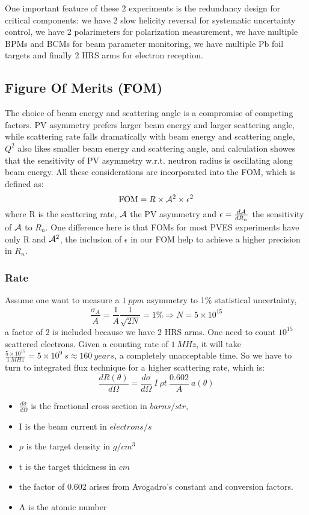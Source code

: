 One important feature of these 2 experiments is the redundancy design for critical
components: we have 2 slow helicity reversal for systematic uncertainty control,
we have 2 polarimeters for polarization measurement, we have multiple BPMs and
BCMs for beam parameter monitoring, we have multiple Pb foil targets and finally
2 HRS arms for electron reception.

\subsection{Figure Of Merits (FOM)}
The choice of beam energy and scattering angle is a compromise of competing
factors. PV asymmetry prefers larger beam energy and larger scattering angle,
while scattering rate falls dramatically with beam energy and scattering angle,
$Q^2$ also likes smaller beam energy and scattering angle, and calculation 
showes that the sensitivity of PV asymmetry w.r.t. neutron radius is oscillating
along beam energy. All these considerations are incorporated into the FOM, which
is defined as:
\begin{equation*}
    \text{FOM} = R \times \mathcal{A}^2 \times \epsilon^2
\end{equation*}
where R is the scattering rate, $\mathcal{A}$ the PV asymmetry and $\epsilon = \frac{d\mathcal{A}}{dR_n}$ 
the sensitivity of $\mathcal{A}$ to $R_n$. One difference here is that FOMs for most PVES 
experiments have only R and $\mathcal{A}^2$, the inclusion of $\epsilon$ in our FOM help
to achieve a higher precision in $R_n$.

\subsubsection{Rate}
Assume one want to measure a $1 \ ppm$ asymmetry to 1\% statistical uncertainty,
$$ \frac{\sigma_A}{A} = \frac{1}{A}\frac{1}{\sqrt{2N}} = 1\% \Rightarrow N = 5 \times 10^{15} $$
a factor of 2 is included because we have 2 HRS arms.
One need to count $10^{15}$ scattered electrons. Given a counting rate of $1\ MHz$, 
it will take $\frac{5\times 10^{15}}{1\ MHz} = 5\times 10^{9}\ s \approx 160 \ years$,
a completely unacceptable time. So we have to turn to integrated flux technique
for a higher scattering rate, which is:
\begin{equation}
    \frac{dR(\theta)}{d\Omega} = \frac{d\sigma}{d\Omega}\ I\ \rho t \  \frac{0.602}{A} \ a(\theta) 
\end{equation}
\begin{itemize}
    \item $\frac{d\sigma}{d\Omega}$ is the fractional cross section in $barns/str$,
    \item I is the beam current in $electrons/s$
    \item $\rho$ is the target density in $g/cm^{3}$
    \item t is the target thickness in $cm$
    \item the factor of 0.602 arises from Avogadro's constant and conversion factors.
    \item A is the atomic number
\end{itemize}

